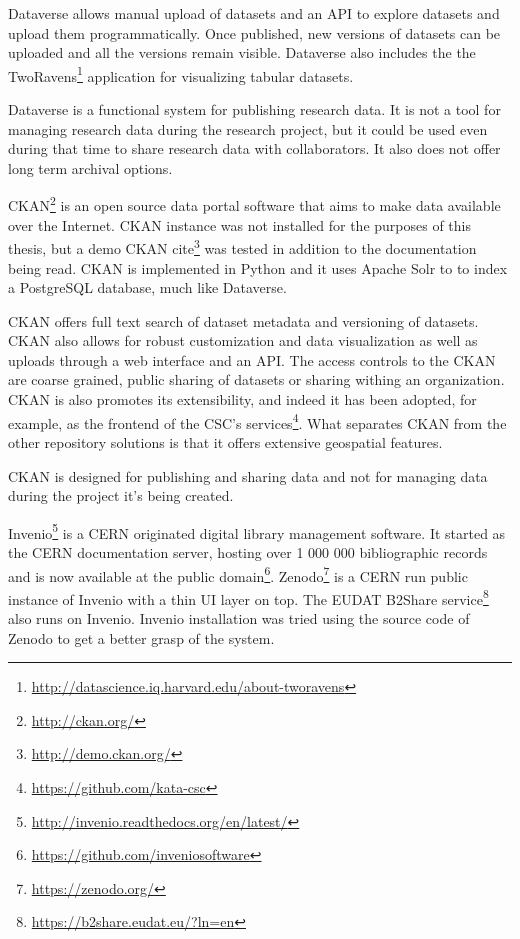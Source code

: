 Dataverse allows manual upload of datasets and an API to explore datasets
and upload them programmatically. Once published, new versions of datasets
can be uploaded and all the versions remain visible. Dataverse also includes the the
TwoRavens\footnote{\url{http://datascience.iq.harvard.edu/about-tworavens}} application
for visualizing tabular datasets.

Dataverse is a functional system for publishing research data. It is not a tool
for managing research data during the research project, but it could be used
even during that time to share research data with collaborators. It also does
not offer long term archival options.

CKAN\footnote{\url{http://ckan.org/}} is an open source data portal software that aims to make data available
over the Internet. CKAN instance was not installed for the purposes of this
thesis, but a demo CKAN cite\footnote{\url{http://demo.ckan.org/}} was tested
in addition to the documentation being read. CKAN is implemented in Python and
it uses Apache Solr to to index a PostgreSQL database, much like Dataverse.

CKAN offers full text search of dataset metadata and versioning of datasets.
CKAN also allows for robust customization and data visualization as well as
uploads through a web interface and an API. The access controls to the CKAN
are coarse grained, public sharing of datasets or sharing withing an
organization. CKAN is also promotes its extensibility, and indeed it has been
adopted, for example, as the frontend of the CSC's
services\footnote{\url{https://github.com/kata-csc}}. What separates CKAN from
the other repository solutions is that it offers extensive geospatial features.

CKAN is designed for publishing and sharing data and not for managing data
during the project it's being created.

Invenio\footnote{\url{http://invenio.readthedocs.org/en/latest/}} is a CERN
originated digital library management software. It started as the CERN
documentation server, hosting over 1 000 000 bibliographic records and is now
available at the public domain\footnote{\url{https://github.com/inveniosoftware}}.
Zenodo\footnote{\url{https://zenodo.org/}}
is a CERN run public instance of Invenio with a thin UI layer on top. The EUDAT
B2Share service\footnote{\url{https://b2share.eudat.eu/?ln=en}} also runs on
Invenio. Invenio installation was tried using the source code of Zenodo to get
a better grasp of the system.

